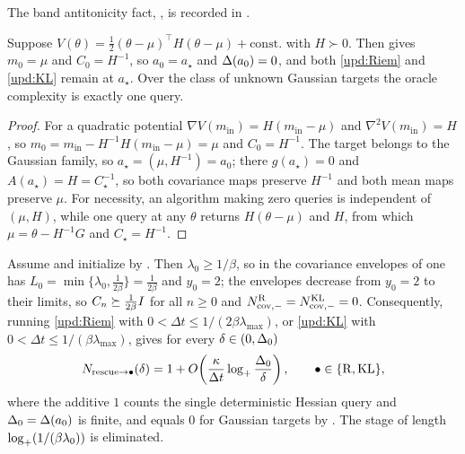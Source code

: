 The band antitonicity fact, , is recorded in .

\begin{theorem}\label{thm:rescue-Gauss}
    Suppose $V(\theta)=\tfrac12(\theta-\mu)^\top H(\theta-\mu)+\mathrm{const.}$ with $H\succ0$.
    Then  gives $m_0=\mu$ and $C_0=H^{-1}$, so $a_0=a_\star$ and
    $\Delta(a_0)=0$, and both \eqref{upd:Riem} and \eqref{upd:KL} remain at $a_\star$. Over
    the class of unknown Gaussian targets the oracle complexity is exactly one query.
\end{theorem}

\begin{proof}
    For a quadratic potential $\nabla V(m_{\mathrm{in}})=H(m_{\mathrm{in}}-\mu)$ and
    $\nabla^2V(m_{\mathrm{in}})=H$, so
    $m_0=m_{\mathrm{in}}-H^{-1}H(m_{\mathrm{in}}-\mu)=\mu$ and $C_0=H^{-1}$. The target belongs
    to the Gaussian family, so $a_\star=(\mu,H^{-1})=a_0$; there $g(a_\star)=0$ and
    $A(a_\star)=H=C_\star^{-1}$, so both covariance maps preserve $H^{-1}$ and both mean maps
    preserve $\mu$. For necessity, an algorithm making zero queries is independent of
    $(\mu,H)$, while one query at any $\theta$ returns $H(\theta-\mu)$ and $H$, from which
    $\mu=\theta-H^{-1}G$ and $C_\star=H^{-1}$.
\end{proof}

\begin{theorem}\label{thm:burnin-rescue}
    Assume  and initialize by . Then
    $\lambda_0\geq1/\beta$, so in the covariance envelopes of 
    one has $L_0=\min\{\lambda_0,\tfrac1{2\beta}\}=\tfrac1{2\beta}$ and $y_0=2$; the envelopes
    decrease from $y_0=2$ to their limits, so $C_n\succeq\tfrac1{2\beta}I$ for all $n\geq0$
    and $N_{\mathrm{cov},-}^{\mathrm{R}}=N_{\mathrm{cov},-}^{\mathrm{KL}}=0$. Consequently, running \eqref{upd:Riem} with
    $0<\Delta t\leq1/(2\beta\lambda_{\max})$, or \eqref{upd:KL} with
    $0<\Delta t\leq1/(\beta\lambda_{\max})$, gives for every $\delta\in(0,\Delta_0)$
    \begin{equation*}
        N_{\mathrm{rescue}\to\bullet}(\delta)
        =
        1+O\!\left(\frac\kappa{\Delta t}\log_+\frac{\Delta_0}\delta\right),
        \qquad \bullet\in\{\mathrm{R},\mathrm{KL}\},
    \end{equation*}
    where the additive $1$ counts the single deterministic Hessian query and
    $\Delta_0=\Delta(a_0)$ is finite, and equals $0$ for Gaussian targets by
    . The stage of length $\log_+(1/(\beta\lambda_0))$ is eliminated.
\end{theorem}

